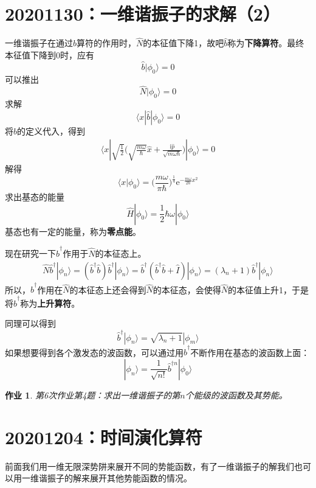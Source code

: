\documentclass[12pt]{article}
\newtheorem{asg}{作业}
\begin{document}
    \section{20201130：一维谐振子的求解（2）}

    一维谐振子在通过$\hat{b}$算符的作用时，$\hat{N}$的本征值下降1，故吧$\hat{b}$称为\textbf{下降算符}。最终本征值下降到0时，应有
    \[ \hat{b}|\phi_0 \rangle = 0 \]
    可以推出
    \[ \hat{N}|\phi_0 \rangle = 0 \]
    求解
    \[ \langle x|\hat{b}|\phi_0 \rangle = 0\]
    将$\hat{b}$的定义代入，得到
    \begin{align*}
        \langle x|\sqrt{\frac 12}\bigg(\sqrt{\frac {m\omega}{\hbar}}\hat{x}+ \frac {\mathrm{i}\hat{p}}{\sqrt{m\omega\hbar}}\bigg)|\phi_0 \rangle = 0
    \end{align*}
    解得
    \[ \langle x|\phi_0\rangle = \bigg(\frac {m\omega}{\pi\hbar} \bigg)^{\frac 14} \mathrm{e}^{-\frac {m\omega}{2\hbar}x^2} \]
    求出基态的能量
    \[ \hat{H}|\phi_0 \rangle = \frac 12 \hbar \omega |\phi_0 \rangle \]
    基态也有一定的能量，称为\textbf{零点能}。

    现在研究一下$\hat{b}^\dagger$作用于$\hat{N}$的本征态上。
    \begin{align*}
        \hat{N}\hat{b}^\dagger |\phi_n \rangle = (\hat{b}^\dagger \hat{b})\hat{b}^\dagger |\phi_n \rangle = \hat{b}^\dagger (\hat{b}^\dagger\hat{b}+\hat{I})|\phi_n \rangle = (\lambda_n+1) \hat{b}^\dagger |\phi_n \rangle
    \end{align*}
    所以，$\hat{b}^\dagger$作用在$\hat{N}$的本征态上还会得到$\hat{N}$的本征态，会使得$\hat{N}$的本征值上升1，于是将$\hat{b}^\dagger$称为\textbf{上升算符}。

    同理可以得到
    \[ \hat{b}^\dagger|\phi_n\rangle = \sqrt{\lambda_n+1}|\phi_m\rangle \]
    如果想要得到各个激发态的波函数，可以通过用$\hat{b}^\dagger$不断作用在基态的波函数上面：
    \[ |\phi_n \rangle = \frac 1{\sqrt{n!}} \hat{b}^{\dagger n} | \phi_0 \rangle \]

    \begin{asg}
        第6次作业第4题：求出一维谐振子的第$n$个能级的波函数及其势能。
    \end{asg}

    \section{20201204：时间演化算符}

    前面我们用一维无限深势阱来展开不同的势能函数，有了一维谐振子的解我们也可以用一维谐振子的解来展开其他势能函数的情况。
\end{document}
